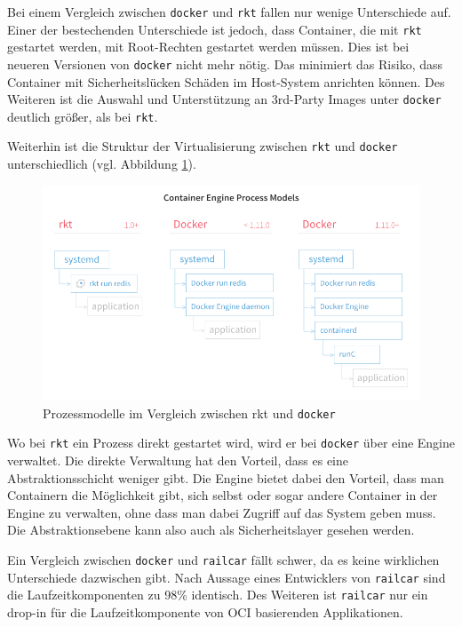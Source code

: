 \documentclass[11pt,a4paper]{article}
\begin{document}
Bei einem Vergleich zwischen \texttt{docker} und \texttt{rkt} fallen nur wenige 
Unterschiede auf. Einer der bestechenden Unterschiede ist jedoch, dass 
Container, die mit \texttt{rkt} gestartet werden, mit Root-Rechten gestartet 
werden müssen. Dies ist bei neueren Versionen von \texttt{docker} nicht mehr 
nötig. Das minimiert das Risiko, dass Container mit Sicherheitslücken Schäden 
im Host-System anrichten können. Des Weiteren ist die Auswahl und Unterstützung 
an 3rd-Party Images unter \texttt{docker} deutlich größer, als bei 
\texttt{rkt}.\cite{rktvsdocker}

Weiterhin ist die Struktur der Virtualisierung zwischen \texttt{rkt} und 
\texttt{docker} unterschiedlich (vgl. Abbildung \ref{fig:rkt_vs_docker}).
\begin{figure}[htp]
	\centering
	\includegraphics[scale=0.5]{img/rkt-vs-docker-process-model.png}
	\caption[Prozessmodelle im Vergleich zwischen rkt und Docker 
	\cite{rktvsdocker,}]{Prozessmodelle im Vergleich zwischen rkt und 
		\texttt{docker} \cite{rktvsdocker}}
	\label{fig:rkt_vs_docker}
\end{figure}
Wo bei \texttt{rkt} ein Prozess direkt gestartet wird, wird er bei 
\texttt{docker} über eine Engine verwaltet. Die direkte Verwaltung hat den 
Vorteil, dass es eine Abstraktionsschicht weniger gibt. Die Engine bietet 
dabei den Vorteil, dass man Containern die Möglichkeit gibt, sich selbst oder 
sogar andere Container in der Engine zu verwalten, ohne dass man dabei Zugriff 
auf das System geben muss. Die Abstraktionsebene kann also auch als 
Sicherheitslayer gesehen werden.

Ein Vergleich zwischen \texttt{docker} und \texttt{railcar} fällt schwer, da es 
keine wirklichen Unterschiede dazwischen gibt. Nach Aussage eines Entwicklers 
von \texttt{railcar} sind die Laufzeitkomponenten zu 98\% 
identisch.\cite{railcarvsdocker} Des Weiteren ist \texttt{railcar} nur ein 
drop-in für die Laufzeitkomponente von \ac{OCI} basierenden Applikationen.
\end{document}
